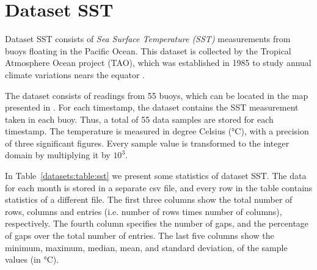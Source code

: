 

\vspace{-10pt}
\section{Dataset SST}
\label{datasets:sst}
\newcommand{\TAODef}{This dataset is collected by the Tropical Atmosphere Ocean project (TAO), which was established in 1985 to study annual climate variations nears the equator \cite{dataset:tao}.}

Dataset SST \cite{dataset:sst1} consists of \textit{Sea Surface Temperature (SST)} measurements from buoys floating in the Pacific Ocean. \TAODef


The dataset consists of readings from 55 buoys, which can be located in the map presented in \cite{dataset:sst1}. For each timestamp, the dataset contains the SST measurement taken in each buoy. Thus, a total of 55 data samples are stored for each timestamp. The temperature is measured in degree Celsius (°C), with a precision of three significant figures. Every sample value is transformed to the integer domain by multiplying it by $10^3$.


\clearpage


In Table~\ref{datasets:table:sst} we present some statistics of dataset SST. The data for each month is stored in a separate csv file, and every row in the table contains statistics of a different file. The first three columns show the total number of rows, columns and entries (i.e. number of rows times number of columns), respectively. The fourth column specifies the number of gaps, and the percentage of gaps over the total number of entries. The last five columns show the minimum, maximum, median, mean, and standard deviation, of the sample values (in °C).





